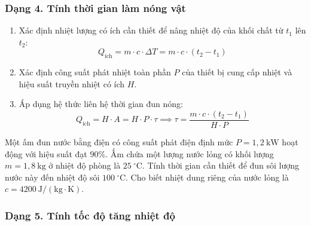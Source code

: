 \subsubsection{Dạng 4. Tính thời gian làm nóng vật}
\begin{phuongphap}
\begin{enumerate}
\item Xác định nhiệt lượng có ích cần thiết để nâng nhiệt độ của khối chất từ $t_1$ lên $t_2$:
\[
Q_{\text{ích}} = m \cdot c \cdot \Delta T = m \cdot c \cdot (t_2 - t_1)
\]
\item Xác định công suất phát nhiệt toàn phần $P$ của thiết bị cung cấp nhiệt và hiệu suất truyền nhiệt có ích $H$.
\item Áp dụng hệ thức liên hệ thời gian đun nóng:
\[
Q_{\text{ích}} = H \cdot A = H \cdot P \cdot \tau \implies \tau = \dfrac{m \cdot c \cdot (t_2 - t_1)}{H \cdot P}
\]
\end{enumerate}
\end{phuongphap}
\begin{vidumau}
Một ấm đun nước bằng điện có công suất phát điện định mức $P = 1{,}2\ \mathrm{kW}$ hoạt động với hiệu suất đạt $90\%$. Ấm chứa một lượng nước lỏng có khối lượng $m = 1{,}8\ \mathrm{kg}$ ở nhiệt độ phòng là $25\ ^\circ\mathrm{C}$. Tính thời gian cần thiết để đun sôi lượng nước này đến nhiệt độ sôi $100\ ^\circ\mathrm{C}$. Cho biết nhiệt dung riêng của nước lỏng là $c = 4200\ \mathrm{J/(kg\cdot K)}$.
\end{vidumau}

\subsubsection{Dạng 5. Tính tốc độ tăng nhiệt độ}

